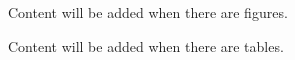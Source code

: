 \documentclass[main.tex]{subfiles}
\begin{document}
	\tableofcontents
	
    \listoffigures
	Content will be added when there are figures.
    
    \listoftables
	Content will be added when there are tables.
	\clearpage
\end{document}
